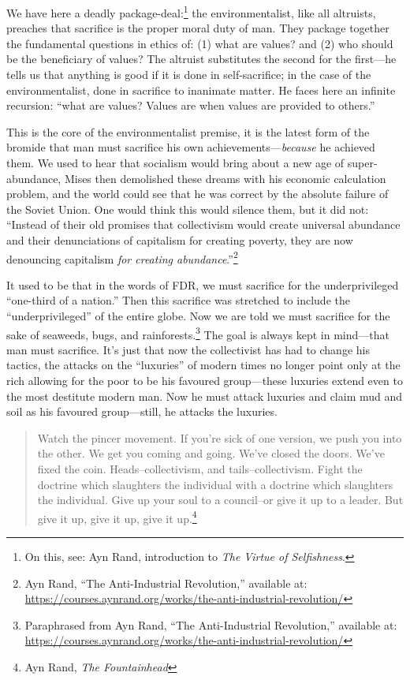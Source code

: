 \documentclass[11pt]{article}
\begin{document}
We have here a deadly package-deal:\footnote{On this, see: Ayn Rand, introduction to \emph{The Virtue of Selfishness}.} the environmentalist, like all altruists, preaches that sacrifice is the proper moral duty of man. They package together the fundamental questions in ethics of: (1) what are values? and (2) who should be the beneficiary of values? The altruist substitutes the second for the first---he tells us that anything is good if it is done in self-sacrifice; in the case of the environmentalist, done in sacrifice to inanimate matter. He faces here an infinite recursion: ``what are values? Values are when values are provided to others.''

This is the core of the environmentalist premise, it is the latest form of the bromide that man must sacrifice his own achievements---\emph{because} he achieved them. We used to hear that socialism would bring about a new age of super-abundance, Mises then demolished these dreams with his economic calculation problem, and the world could see that he was correct by the absolute failure of the Soviet Union. One would think this would silence them, but it did not: ``Instead of their old promises that collectivism would create universal abundance and their denunciations of capitalism for creating poverty, they are now denouncing capitalism \emph{for creating abundance}.''\footnote{Ayn Rand, ``The Anti-Industrial Revolution,'' available at: \url{https://courses.aynrand.org/works/the-anti-industrial-revolution/}}

It used to be that in the words of FDR, we must sacrifice for the underprivileged ``one-third of a nation.'' Then this sacrifice was stretched to include the ``underprivileged'' of the entire globe. Now we are told we must sacrifice for the sake of seaweeds, bugs, and rainforests.\footnote{Paraphrased from Ayn Rand, ``The Anti-Industrial Revolution,'' available at: \url{https://courses.aynrand.org/works/the-anti-industrial-revolution/}} The goal is always kept in mind---that man must sacrifice. It's just that now the collectivist has had to change his tactics, the attacks on the ``luxuries'' of modern times no longer point only at the rich allowing for the poor to be his favoured group---these luxuries extend even to the most destitute modern man. Now he must attack luxuries and claim mud and soil as his favoured group---still, he attacks the luxuries.

\begin{quote}
Watch the pincer movement. If you’re sick of one version, we push you into the other. We get you coming and going. We’ve closed the doors. We’ve fixed the coin. Heads--collectivism, and tails--collectivism. Fight the doctrine which slaughters the individual with a doctrine which slaughters the individual. Give up your soul to a council--or give it up to a leader. But give it up, give it up, give it up.\footnote{Ayn Rand, \emph{The Fountainhead}}
\end{quote}
\end{document}
